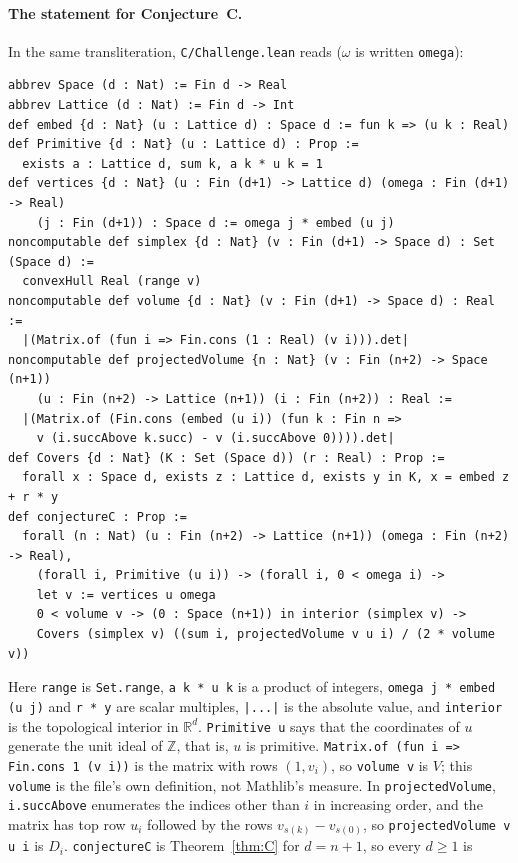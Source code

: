 \documentclass[11pt]{article}
\theoremstyle{definition}
\theoremstyle{remark}
\newcommand{\R}{\mathbb R}
\newcommand{\Z}{\mathbb Z}
\begin{document}
{\paragraph{The statement for Conjecture~C.}
In the same transliteration, \texttt{C/Challenge.lean} reads ($\omega$ is
written \texttt{omega}):
{\footnotesize
\begin{verbatim}
abbrev Space (d : Nat) := Fin d -> Real
abbrev Lattice (d : Nat) := Fin d -> Int
def embed {d : Nat} (u : Lattice d) : Space d := fun k => (u k : Real)
def Primitive {d : Nat} (u : Lattice d) : Prop :=
  exists a : Lattice d, sum k, a k * u k = 1
def vertices {d : Nat} (u : Fin (d+1) -> Lattice d) (omega : Fin (d+1) -> Real)
    (j : Fin (d+1)) : Space d := omega j * embed (u j)
noncomputable def simplex {d : Nat} (v : Fin (d+1) -> Space d) : Set (Space d) :=
  convexHull Real (range v)
noncomputable def volume {d : Nat} (v : Fin (d+1) -> Space d) : Real :=
  |(Matrix.of (fun i => Fin.cons (1 : Real) (v i))).det|
noncomputable def projectedVolume {n : Nat} (v : Fin (n+2) -> Space (n+1))
    (u : Fin (n+2) -> Lattice (n+1)) (i : Fin (n+2)) : Real :=
  |(Matrix.of (Fin.cons (embed (u i)) (fun k : Fin n =>
    v (i.succAbove k.succ) - v (i.succAbove 0)))).det|
def Covers {d : Nat} (K : Set (Space d)) (r : Real) : Prop :=
  forall x : Space d, exists z : Lattice d, exists y in K, x = embed z + r * y
def conjectureC : Prop :=
  forall (n : Nat) (u : Fin (n+2) -> Lattice (n+1)) (omega : Fin (n+2) -> Real),
    (forall i, Primitive (u i)) -> (forall i, 0 < omega i) ->
    let v := vertices u omega
    0 < volume v -> (0 : Space (n+1)) in interior (simplex v) ->
    Covers (simplex v) ((sum i, projectedVolume v u i) / (2 * volume v))
\end{verbatim}}
\noindent Here \texttt{range} is \texttt{Set.range}, \texttt{a k * u k} is a
product of integers, \texttt{omega j * embed (u j)} and \texttt{r * y} are
scalar multiples, \texttt{|...|} is the absolute value, and
\texttt{interior} is the topological interior in $\R^d$. \texttt{Primitive u}
says that the coordinates of $u$ generate the unit ideal of $\Z$, that is,
$u$ is primitive. \texttt{Matrix.of (fun i => Fin.cons 1 (v i))} is the matrix
with rows $(1,v_i)$, so \texttt{volume v} is $V$; this \texttt{volume} is the
file's own definition, not Mathlib's measure. In \texttt{projectedVolume},
\texttt{i.succAbove} enumerates the indices other than $i$ in increasing
order, and the matrix has top row $u_i$ followed by the rows
$v_{s(k)}-v_{s(0)}$, so \texttt{projectedVolume v u i} is $D_i$.
\texttt{conjectureC} is Theorem~\ref{thm:C} for $d=n+1$, so every $d\ge1$ is
}
\end{document}
